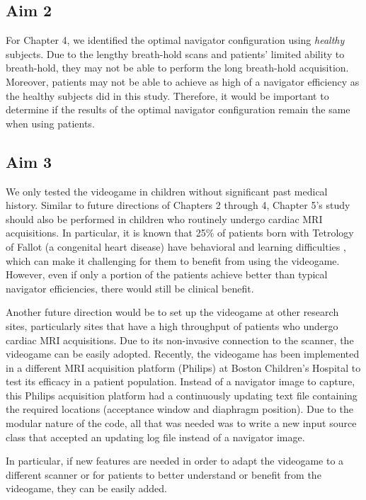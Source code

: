 \subsection{Aim 2}
	For Chapter 4, we identified the optimal navigator configuration using \textit{healthy} subjects. Due to the lengthy breath-hold scans and patients' limited ability to breath-hold, they may not be able to perform the long breath-hold acquisition. Moreover, patients may not be able to achieve as high of a navigator efficiency as the healthy subjects did in this study. Therefore, it would be important to determine if the results of the optimal navigator configuration remain the same when using patients.

\subsection{Aim 3}
	We only tested the videogame in children without significant past medical history. Similar to future directions of Chapters 2 through 4, Chapter 5's study should also be performed in children who routinely undergo cardiac MRI acquisitions. In particular, it is known that 25\% of patients born with Tetrology of Fallot (a congenital heart disease) have behavioral and learning difficulties \cite{Piran2011}, which can make it challenging for them to benefit from using the videogame. However, even if only a portion of the patients achieve better than typical navigator efficiencies, there would still be clinical benefit.

	Another future direction would be to set up the videogame at other research sites, particularly sites that have a high throughput of patients who undergo cardiac MRI acquisitions. Due to its non-invasive connection to the scanner, the videogame can be easily adopted. Recently, the videogame has been implemented in a different MRI acquisition platform (Philips) at Boston Children's Hospital to test its efficacy in a patient population. Instead of a navigator image to capture, this Philips acquisition platform had a continuously updating text file containing the required locations (acceptance window and diaphragm position). Due to the modular nature of the code, all that was needed was to write a new input source class that accepted an updating log file instead of a navigator image.

	In particular, if new features are needed in order to adapt the videogame to a different scanner or for patients to better understand or benefit from the videogame, they can be easily added.
	
